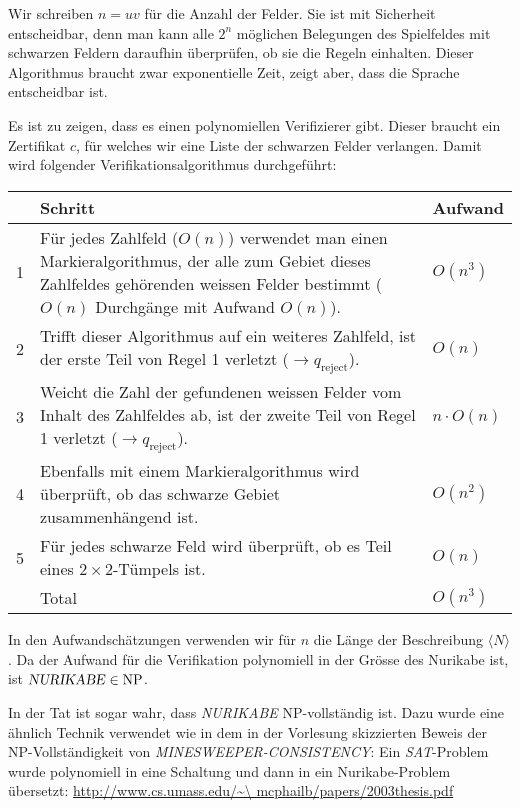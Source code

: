 \begin{loesung}
Wir schreiben $n=uv$ für die Anzahl der Felder.
Sie ist mit Sicherheit entscheidbar, denn man kann alle $2^{n}$
möglichen Belegungen des Spielfeldes mit schwarzen Feldern daraufhin
überprüfen, ob sie die Regeln einhalten. Dieser Algorithmus braucht
zwar exponentielle Zeit, zeigt aber, dass die Sprache entscheidbar ist.

Es ist zu zeigen, dass es einen polynomiellen Verifizierer gibt. Dieser
braucht ein Zertifikat $c$, für welches wir eine Liste der schwarzen
Felder verlangen. Damit wird folgender Verifikationsalgorithmus
durchgeführt:
\begin{center}
\begin{tabular}{rll}
&Schritt&Aufwand\\
\hline
1&\begin{minipage}[t]{4.2truein}\strut
Für jedes Zahlfeld ($O(n)$) verwendet man einen Markieralgorithmus,
der alle zum Gebiet dieses Zahlfeldes gehörenden weissen
Felder bestimmt ($O(n)$ Durchgänge mit Aufwand
$O(n)$).\strut\end{minipage}&$O(n^3)$\\
2&\begin{minipage}[t]{4.2truein}\strut
Trifft dieser Algorithmus auf ein weiteres
Zahlfeld, ist der erste Teil von Regel 1 verletzt
($\to q_{\text{reject}}$).
\strut\end{minipage}&$O(n)$\\
3&\begin{minipage}[t]{4.2truein}\strut
Weicht die Zahl der gefundenen weissen Felder vom Inhalt des Zahlfeldes
ab, ist der zweite Teil von Regel 1 verletzt
($\to q_{\text{reject}}$).\strut\end{minipage}&$n\cdot O(n)$\\
4&\begin{minipage}[t]{4.2truein}\strut
Ebenfalls mit einem Markieralgorithmus wird überprüft, ob das
schwarze Gebiet zusammenhängend ist.
\strut\end{minipage}&$O(n^2)$\\
5&\begin{minipage}[t]{4.2truein}\strut
Für jedes schwarze Feld wird überprüft, ob es Teil eines
$2\times 2$-Tümpels ist.
\strut\end{minipage}&$O(n)$\\
\hline
&Total&$O(n^3)$
\end{tabular}
\end{center}
In den Aufwandschätzungen verwenden wir für $n$ die Länge der
Beschreibung $\langle N\rangle$. Da der Aufwand für die Verifikation
polynomiell in der Grösse des Nurikabe ist, ist
$\text{\textsl{NURIKABE}}\in\operatorname{NP}$.

In der Tat ist sogar wahr, dass \textsl{NURIKABE} NP-vollständig
ist. Dazu wurde eine ähnlich Technik verwendet wie in dem in
der Vorlesung skizzierten Beweis
der NP-Vollständigkeit von \textsl{MINESWEEPER-CONSISTENCY}:
Ein \textsl{SAT}-Problem wurde polynomiell in eine Schaltung und dann in
ein Nurikabe-Problem übersetzt:
\url{http://www.cs.umass.edu/\~\ mcphailb/papers/2003thesis.pdf}
\end{loesung}
